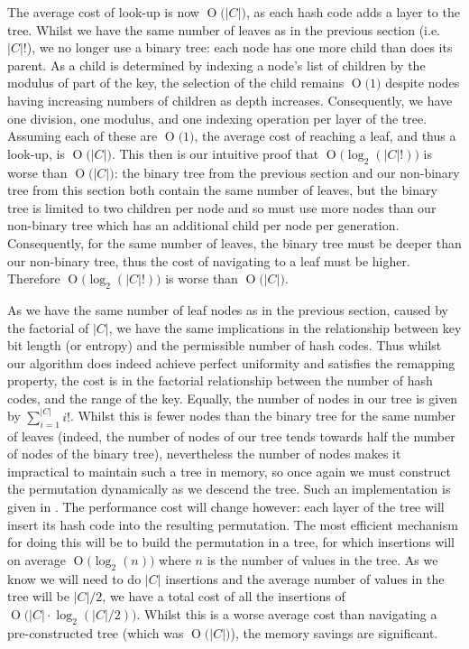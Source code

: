 \documentclass[runningheads,a4paper]{llncs}
\newcommand{\BigO}[1]{\ensuremath{\operatorname{O}\bigl(#1\bigr)}}
\begin{document}
The average cost of look-up is now $\BigO{|C|}$, as each hash code
adds a layer to the tree. Whilst we have the same number of leaves as
in the previous section (i.e. $|C|!$), we no longer use a binary tree:
each node has one more child than does its parent. As a child is
determined by indexing a node's list of children by the modulus of
part of the key, the selection of the child remains $\BigO{1}$ despite
nodes having increasing numbers of children as depth
increases. Consequently, we have one division, one modulus, and one
indexing operation per layer of the tree. Assuming each of these are
$\BigO{1}$, the average cost of reaching a leaf, and thus a look-up,
is $\BigO{|C|}$. This then is our intuitive proof that
$\BigO{\log_2(|C|!)}$ is worse than $\BigO{|C|}$: the binary tree from
the previous section and our non-binary tree from this section both
contain the same number of leaves, but the binary tree is limited to
two children per node and so must use more nodes than our non-binary
tree which has an additional child per node per
generation. Consequently, for the same number of leaves, the binary
tree must be deeper than our non-binary tree, thus the cost of
navigating to a leaf must be higher. Therefore $\BigO{\log_2(|C|!)}$
is worse than $\BigO{|C|}$.

As we have the same number of leaf nodes as in the previous section,
caused by the factorial of $|C|$, we have the same implications in the
relationship between key bit length (or entropy) and the permissible
number of hash codes. Thus whilst our algorithm does indeed achieve
perfect uniformity and satisfies the remapping property, the cost is
in the factorial relationship between the number of hash codes, and
the range of the key. Equally, the number of nodes in our tree is
given by $\sum\nolimits_{i=1}^{|C|}{i!}$. Whilst this is fewer nodes
than the binary tree for the same number of leaves (indeed, the number
of nodes of our tree tends towards half the number of nodes of the
binary tree), nevertheless the number of nodes makes it impractical to
maintain such a tree in memory, so once again we must construct the
permutation dynamically as we descend the tree. Such an implementation
is given in . The performance cost will change
however: each layer of the tree will insert its hash code into the
resulting permutation. The most efficient mechanism for doing this
will be to build the permutation in a tree, for which insertions will
on average $\BigO{\log_2(n)}$ where $n$ is the number of values in the
tree. As we know we will need to do $|C|$ insertions and the average
number of values in the tree will be $|C|/2$, we have a total cost of
all the insertions of $\BigO{|C| \cdot \log_2(|C|/2)}$. Whilst this is
a worse average cost than navigating a pre-constructed tree (which was
$\BigO{|C|}$), the memory savings are significant.
\end{document}
